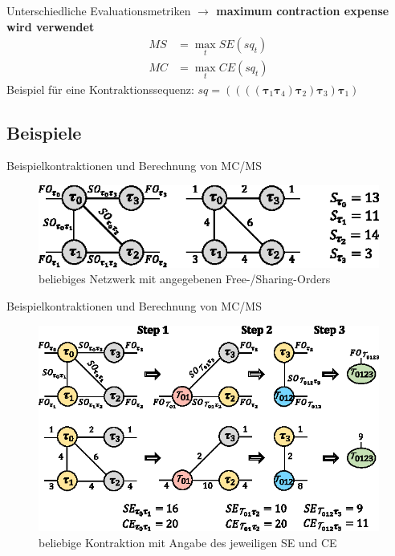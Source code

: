 \documentclass{beamer}
\begin{document}
\begin{frame}{Unterschiedliche Evaluationsmetriken}
	\textbf{$\rightarrow$ maximum contraction expense wird verwendet}
	\begin{align*}
		MS & = \max_t SE(sq_t) \\ MC &= \max_t CE(sq_t)
	\end{align*}
	Beispiel für eine Kontraktionssequenz:
	$sq = ((((\bm{\tau}_{1} \bm{\tau}_{4}) \bm{\tau}_{2}) \bm{\tau}_{3}) \bm{\tau}_{1})$
\end{frame}


\subsection{Beispiele}

\begin{frame}{Beispielkontraktionen und Berechnung von MC/MS}
	\begin{figure}
		\includegraphics{figure_03_a}
		\caption*{beliebiges Netzwerk mit angegebenen Free-/Sharing-Orders}
	\end{figure}
\end{frame}

\begin{frame}{Beispielkontraktionen und Berechnung von MC/MS}
	\begin{figure}
		\includegraphics{figure_03_b}
		\caption*{beliebige Kontraktion mit Angabe des jeweiligen SE und CE}
	\end{figure}
\end{frame}
\end{document}
